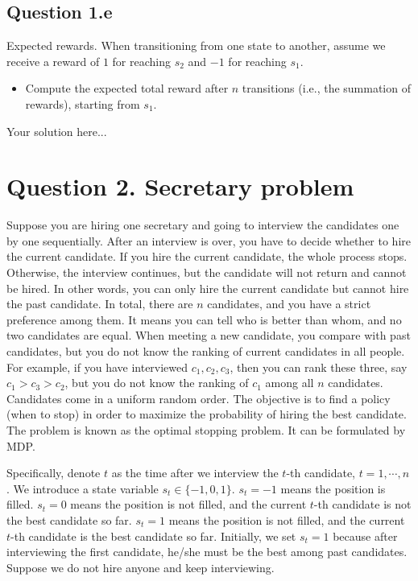 \documentclass[12pt]{article}
\begin{document}
\subsection*{Question 1.e} Expected rewards. When transitioning from one state to another, assume we receive a reward of $1$ for reaching $s_2$ and $-1$ for reaching $s_1$.
\begin{itemize}
    \item Compute the expected total reward after 
$n$ transitions (i.e., the summation of rewards), starting from $s_1$.
\end{itemize}

\begin{solution}
Your solution here...
\end{solution}

\section*{Question 2. Secretary problem}

Suppose you are hiring one secretary and going to interview the
candidates one by one sequentially. After an interview is over, you have to decide whether to hire
the current candidate. If you hire the current candidate, the whole process stops. Otherwise, the
interview continues, but the candidate will not return and cannot be hired. In other words, you
can only hire the current candidate but cannot hire the past candidate. In total, there are $n$ candidates,
and you have a strict preference among them. It means you can tell who is better than whom, and
no two candidates are equal. When meeting a new candidate, you compare with past candidates, but you do not know the ranking of current candidates in all people. For example, if you have
interviewed $c_1,c_2,c_3$, then you can rank these three, say $c_1>c_3>c_2$, but you do not know the ranking of $c_1$ among all $n$ candidates. Candidates come in a uniform random order. The objective is to find a policy (when to stop) in order to maximize the probability of hiring the best candidate.
The problem is known as the optimal stopping problem. It can be formulated by MDP.

Specifically, denote $t$ as the time after we interview the $t$-th candidate, $t = 1, \cdots, n$. We introduce a state variable $s_t \in \{-1, 0, 1\}$. $s_t = -1$  means the position is filled. $s_t = 0$ means the position is
    not filled, and the current $t$-th candidate is not the best candidate so far. $s_t = 1$  means the
    position is not filled, and the current $t$-th candidate is the best candidate so far.  Initially, we
    set $s_t = 1$ because after interviewing the first candidate, he/she must be the best among
    past candidates. Suppose we do not hire anyone and keep interviewing.
\end{document}
